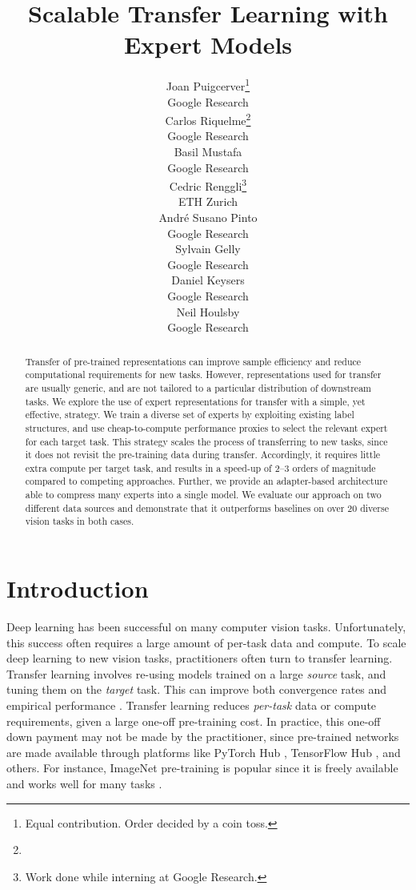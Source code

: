 \documentclass{article}
\title{Scalable Transfer Learning with Expert Models}
\author{Joan Puigcerver\thanks{Equal contribution. Order decided by a coin toss.} \\
  Google Research \\
  \And 
  Carlos Riquelme\footnote[1]{} \\
  Google Research \\  
  \And 
  Basil Mustafa \\
  Google Research \\  
  \And 
  Cedric Renggli\thanks{Work done while interning at Google Research.} \\
  ETH Zurich\\
  \And 
  Andr\'e Susano Pinto \\
  Google Research \\  
  \And 
  Sylvain Gelly \\
  Google Research \\  
  \And 
  Daniel Keysers \\
  Google Research \\  
  \And 
  Neil Houlsby\\
  Google Research \\  
}
\begin{document}
\maketitle

\begin{abstract}
Transfer of pre-trained representations can improve sample efficiency and reduce computational requirements for new tasks. However, representations used for transfer are usually generic, and are not tailored to a particular distribution of downstream tasks. We explore the use of expert representations for transfer with a simple, yet effective, strategy. We train a diverse set of experts by exploiting existing label structures, and use cheap-to-compute performance proxies to select the relevant expert for each target task. 
This strategy scales the process of transferring to new tasks, since it does not revisit the pre-training data during transfer.
Accordingly, it requires little extra compute per target task, and results in a speed-up of 2--3 orders of magnitude compared to competing approaches.
Further, we provide an adapter-based architecture able to compress many experts into a single model. We evaluate our approach on two different data sources and demonstrate that it outperforms baselines on over 20 diverse vision tasks in both cases.
\end{abstract} \section{Introduction}

Deep learning has been successful on many computer vision tasks.
Unfortunately, this success often requires a large amount of per-task data and compute.
To scale deep learning to new vision tasks, practitioners often turn to transfer learning.
Transfer learning involves re-using models trained on a large \emph{source} task, and tuning them on the \emph{target} task.
This can improve both convergence rates \cite{ben2007analysis, ben2010theory, blitzer2008learning,
du2017hypothesis,
kuzborskij2013stability,
mansour2009domain,
mansour2009domainsources} and empirical performance \cite{dai2007boosting, donahue2014decaf, oquab2014learning, sharif2014cnn, tan2018survey}.
Transfer learning reduces \emph{per-task} data or compute requirements, given a large one-off pre-training cost.
In practice, this one-off down payment may not be made by the practitioner, since pre-trained networks are made available through platforms like PyTorch Hub \cite{website:pythorch-hub}, TensorFlow Hub \cite{website:tfhub}, and others.
For instance, ImageNet pre-training is popular since it is freely
available and works well for many tasks 
\cite{donahue2014decaf, oquab2014learning, sharif2014cnn}.
\end{document}
